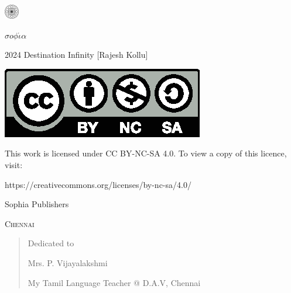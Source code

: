 \begin{center}
\HUGE{\thetitle}
\end{center}
\cleardoublepage

\begin{center}
\HUGE{\thetitle}
\end{center}

\begin{center}
\LARGE{\theauthor}
\end{center}

\vfill

\begin{center}
    \includegraphics[width=18pt]{logo.pdf}

    $\sigma o \phi \acute{\iota} \alpha$
\end{center}
\clearpage

\begingroup
\footnotesize
\setlength{\parindent}{0pt}
\setlength{\parskip}{\baselineskip}

\textcopyright{} 2024 Destination Infinity [Rajesh Kollu]

\includegraphics{by-nc-sa.eps}

This work is licensed under CC BY-NC-SA 4.0. To view a copy of this licence,
visit:

https://creativecommons.org/licenses/by-nc-sa/4.0/

\endgroup

\vfill

{\footnotesize
Sophia Publishers

\textsc{Chennai}
}

\clearpage

\begin{quote}
\begin{center}Dedicated to

\Large
Mrs. P. Vijayalakshmi
\normalsize

My Tamil Language Teacher @ D.A.V, Chennai
\end{center}
\end{quote}


